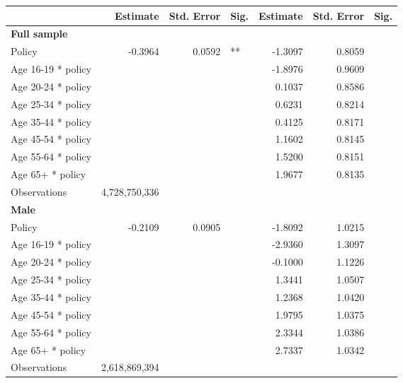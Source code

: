 
\begin{table}%
\centering 
\begin{tabular}{l r r l r r l} 

\hline 
 
 & Estimate & Std. Error & Sig. & Estimate & Std. Error & Sig. \\ 

\hline 
 
\textbf{Full sample} \\ 

Policy             &  -0.3964        &  0.0592       &   **       &  -1.3097        &  0.8059       &            \\ 
Age 16-19 * policy           & & &  &  -1.8976        &  0.9609       &            \\ 
Age 20-24 * policy           & & &  &  0.1037        &  0.8586       &            \\ 
Age 25-34 * policy           & & &  &  0.6231        &  0.8214       &            \\ 
Age 35-44 * policy           & & &  &  0.4125        &  0.8171       &            \\ 
Age 45-54 * policy           & & &  &  1.1602        &  0.8145       &            \\ 
Age 55-64 * policy           & & &  &  1.5200        &  0.8151       &            \\ 
Age 65+ * policy           & & &  &  1.9677        &  0.8135       &            \\ 
Observations & 4,728,750,336 \\ 


\hline 

\textbf{Male} \\ 

Policy             &  -0.2109        &  0.0905       &            &  -1.8092        &  1.0215       &            \\ 
Age 16-19 * policy           & & &  &  -2.9360        &  1.3097       &            \\ 
Age 20-24 * policy           & & &  &  -0.1000        &  1.1226       &            \\ 
Age 25-34 * policy           & & &  &  1.3441        &  1.0507       &            \\ 
Age 35-44 * policy           & & &  &  1.2368        &  1.0420       &            \\ 
Age 45-54 * policy           & & &  &  1.9795        &  1.0375       &            \\ 
Age 55-64 * policy           & & &  &  2.3344        &  1.0386       &            \\ 
Age 65+ * policy           & & &  &  2.7337        &  1.0342       &            \\ 
Observations & 2,618,869,394 \\ 



\end{tabular}
\end{table}
